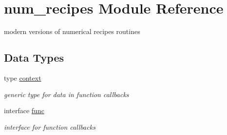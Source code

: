 \hypertarget{namespacenum__recipes}{}\section{num\+\_\+recipes Module Reference}
\label{namespacenum__recipes}


modern versions of numerical recipes routines  


\subsection*{Data Types}
\begin{DoxyCompactItemize}
\item 
type \hyperlink{structnum__recipes_1_1context}{context}
\begin{DoxyCompactList}\small\item\em generic type for data in function callbacks \end{DoxyCompactList}\item 
interface \hyperlink{interfacenum__recipes_1_1func}{func}
\begin{DoxyCompactList}\small\item\em interface for function callbacks \end{DoxyCompactList}\end{DoxyCompactItemize}
